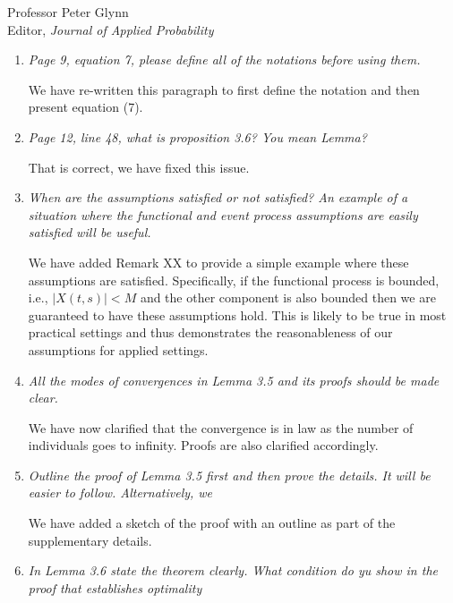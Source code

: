 \documentclass[11pt]{letter} %
\begin{document}
\begin{letter}{Professor
	Peter Glynn\\
	Editor, {\em Journal of Applied Probability}}
\begin{enumerate}
\item {\it Page 9, equation 7, please define all of the notations before using them.}

\vspace{5mm}
We have re-written this paragraph to first define the notation and then present equation (7).
\vspace{5mm}

\item {\it Page 12, line 48, what is proposition 3.6? You mean Lemma?}

\vspace{5mm}
That is correct, we have fixed this issue.
\vspace{5mm}

\item {\it When are the assumptions satisfied or not satisfied? An example of a
situation where the functional and event process assumptions are easily satisfied will be useful.}

\vspace{5mm}
We have added Remark XX to provide a simple example where these assumptions are satisfied.  Specifically, if the functional process is bounded, i.e., $|X(t,s)| < M$ and the other component is also bounded then we are guaranteed to have these assumptions hold.  This is likely to be true in most practical settings and thus demonstrates the reasonableness of our assumptions for applied settings.
\vspace{5mm}

\item {\it All the modes of convergences in Lemma 3.5 and its proofs should be made clear.}

\vspace{5mm}
We have now clarified that the convergence is in law as the number of individuals goes to infinity.  Proofs are also clarified accordingly.
\vspace{5mm}

\item {\it Outline the proof of Lemma 3.5 first and then prove the details.  It will be easier to follow.  Alternatively, we }

\vspace{5mm}
We have added a sketch of the proof with an outline as part of the supplementary details.
\vspace{5mm}

\item {\it In Lemma 3.6 state the theorem clearly.  What condition do yu show in the proof that establishes optimality}


\end{enumerate}
\end{letter}
\end{document}
